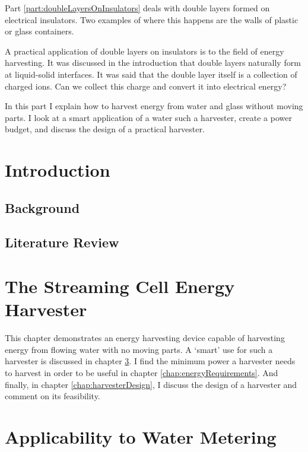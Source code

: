 
Part \ref{part:doubleLayersOnInsulators} deals with double layers formed on electrical insulators.
Two examples of where this happens are the walls of plastic or glass containers.

A practical application of double layers on insulators is to the field of energy harvesting.
It was discussed in the introduction that double layers naturally form at liquid-solid interfaces.
It was said that the double layer itself is a collection of charged ions.
Can we collect this charge and convert it into electrical energy?

In this part I explain how to harvest energy from water and glass without moving parts.
I look at a smart application of a water such a harvester, create a power budget, and discuss the design of a practical harvester.

\chapter{Introduction}
  \label{chap:harvesterIntroduction}
  \section{Background}
  \section{Literature Review}

\chapter{The Streaming Cell Energy Harvester}
  \label{chap:harvestingEnergy}

  This chapter demonstrates an energy harvesting device capable of harvesting energy from flowing water with no moving parts.
  A `smart' use for such a harvester is discussed in chapter \ref{chap:wirelessWaterMetering}.
  I find the minimum power a harvester needs to harvest in order to be useful in chapter \ref{chap:energyRequirements}.
  And finally, in chapter \ref{chap:harvesterDesign}, I discuss the design of a harvester and comment on its feasibility.

  

\chapter{Applicability to Water Metering}
  \label{chap:wirelessWaterMetering}

